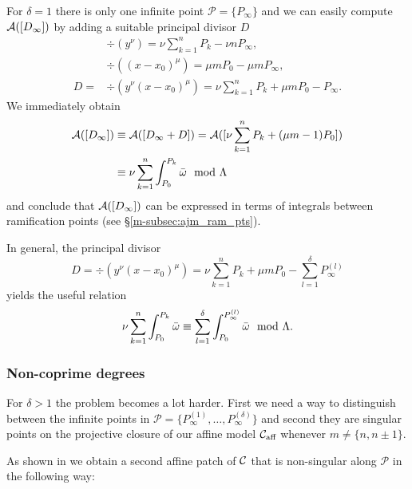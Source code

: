 \documentclass[main.tex]{subfiles}
\begin{document}
  For $\delta = 1$ there is only one infinite point $\mathcal{P} = \{ P_{\infty} \}$ and
  we can easily compute  $\mathcal{A}( [D_{\infty}] )$ by adding a suitable
  principal divisor $D$
    \begin{align*}
      &\div(y^{\nu})=  \nu \sum_{k = 1}^n P_k - \nu n P_{\infty},\\
      &\div((x-x_0)^{\mu})  =  \mu m P_0 - \mu m P_{\infty} ,\\
      D  =  & \div(y^{\nu}(x-x_0)^{\mu})  = \nu \sum_{k = 1}^n P_k + \mu m P_0 - P_{\infty}.
    \end{align*}
    We immediately obtain
    \begin{align*}
     \mathcal{A}( [D_{\infty}] )  & \equiv  \mathcal{A}([D_{\infty} + D])  =  \mathcal{A}( [ \nu \sum_{k = 1}^n P_k + (\mu m - 1) P_0 ]  ) \\ &
      \equiv   \nu \sum_{k=1}^n \int_{P_0}^{P_k} \bar{\omega} \mod \Lambda
    \end{align*}
    and conclude that $\mathcal{A}( [D_{\infty}] )$ can be expressed in terms of integrals between
    ramification points (see \S \ref{m-subsec:ajm_ram_pts}).
  \begin{rmk}\label{rmk:sum_infty_pts}
  In general, the principal divisor
  \begin{equation*}
    D  = \div(y^{\nu}(x-x_0)^{\mu}) = \nu \sum_{k = 1}^n P_k + \mu m P_0 - \sum_{l = 1}^{\delta} P^{(l)}_{\infty}
  \end{equation*}
  yields the useful relation
  \begin{equation*}
  \nu \sum_{k=1}^n \int_{P_0}^{P_k} \bar{\omega} \equiv \sum_{l = 1}^{\delta} \int_{P_0}^{P^{(l)}_{\infty}} \bar{\omega} \mod \Lambda.
  \end{equation*}
  \end{rmk}



 \subsubsection{Non-coprime degrees}\label{subsec:ajm_inf_ncop}

  For $\delta > 1$ the problem becomes a lot harder. First we need a way to distinguish between the infinite points in $\mathcal{P}
  = \{ P_{\infty}^{(1)},\dots, P_{\infty}^{(\delta)} \}$ and second they are singular points
  on the projective closure of our affine model $\mathcal{C}_{\text{aff}}$
  whenever $m \ne \{n,n\pm1\}$.

  As shown in \cite[\S 1]{CT1996} we obtain a second affine patch of $\mathcal{C}$ that is non-singular along $\mathcal{P}$
  in the following way:
\end{document}
